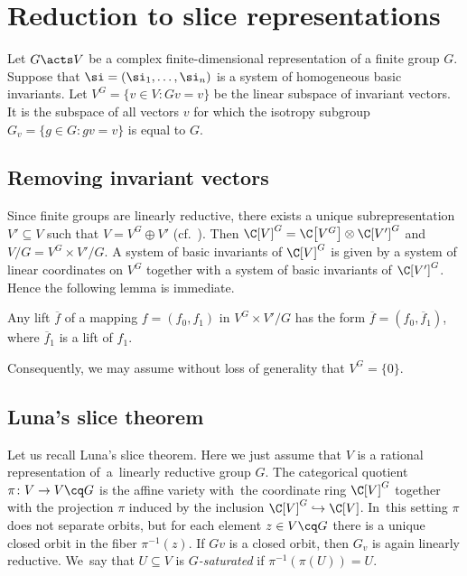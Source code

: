 \section{Reduction to slice representations}

Let $G \acts V$ be a complex finite-dimensional representation of a finite group $G$.
Suppose that $\si=(\si_1,\dots,\si_n)$ is a system of homogeneous basic invariants.
Let $V^G = \{v \in V \colon Gv=v\}$ be the linear subspace of invariant vectors.
It is the subspace of all vectors $v$ for which the isotropy subgroup $G_v = \{g \in G \colon gv = v\}$ is
equal to $G$.

\subsection{Removing invariant vectors} %

Since finite groups are linearly reductive,
there exists a unique subrepresentation $V' \subseteq V$ such that $V = V^G \oplus V'$ (cf.\ \cite[Theorem 2.2.5]{DK02}).
Then
$\C[V]^G = \C\big[V^G\big] \otimes \C[V']^G$ and
$V/ G = V^G \times V' / G$.
A system of basic invariants of $\C[V]^G$ is given by a system of linear coordinates on $V^G$ together with a
system of basic invariants of $\C[V']^G$. Hence the following lemma is immediate.

\begin{Lemma} \label{fix}
Any lift $\overline f$ of a mapping $f=(f_0,f_1)$ in $V^G \times V' / G$ has the form
$\overline f = (f_0,\overline f_1)$,
where $\overline f_1$ is a lift of $f_1$.
\end{Lemma}


Consequently, we may assume without loss of generality that $V^G = \{0\}$.


\subsection{Luna's slice theorem}
Let us recall Luna's slice theorem.
Here we just assume that $V$ is a rational representation of~a~linearly reductive group $G$.
The categorical quotient $\pi \colon V \to V\cq G$ is the affine variety with~the coordinate ring $\C[V]^G$
together with the projection $\pi$ induced by the inclusion \mbox{$\C[V]^G \hookrightarrow \C[V]$}. In~this setting $\pi$ does not separate orbits, but for each element $z \in V \cq G$ there is a unique
closed orbit in the fiber $\pi^{-1}(z)$.
If $Gv$ is a closed orbit, then $G_v$ is again linearly reductive. We~say that $U \subseteq V$ is \emph{$G$-saturated} if $\pi^{-1} (\pi(U)) = U$.

